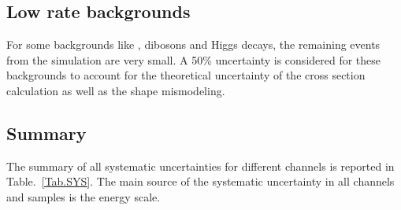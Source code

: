 \subsection{Low rate backgrounds} For some backgrounds like \ttbar, dibosons and Higgs decays, the remaining 
events from the simulation are very small. A 50\% uncertainty is considered for these backgrounds to account for the theoretical uncertainty of the
cross section calculation as well as the shape mismodeling.

\subsection{Summary}
The summary of all systematic uncertainties for different channels is reported in Table.~\ref{Tab.SYS}. The main source of the systematic uncertainty in all channels and samples is the \hadtau energy scale.


